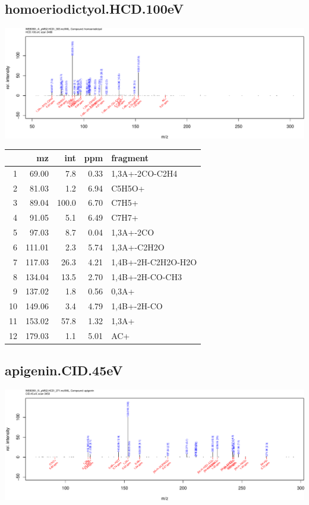 \documentclass[]{article}
\begin{document}
\clearpage\subsection{homoeriodictyol.HCD.100eV}
\includegraphics[width=\textwidth]{WEB350_files/figure-latex/unnamed-chunk-3-12}

\begin{table}[ht]
\centering
\begin{tabular}{rrrrl}
  \toprule
 & mz & int & ppm & fragment \\ 
  \midrule
1 & 69.00 & 7.8 & 0.33 & 1,3A+-2CO-C2H4 \\ 
  2 & 81.03 & 1.2 & 6.94 & C5H5O+ \\ 
  3 & 89.04 & 100.0 & 6.70 & C7H5+ \\ 
  4 & 91.05 & 5.1 & 6.49 & C7H7+ \\ 
  5 & 97.03 & 8.7 & 0.04 & 1,3A+-2CO \\ 
  6 & 111.01 & 2.3 & 5.74 & 1,3A+-C2H2O \\ 
  7 & 117.03 & 26.3 & 4.21 & 1,4B+-2H-C2H2O-H2O \\ 
  8 & 134.04 & 13.5 & 2.70 & 1,4B+-2H-CO-CH3 \\ 
  9 & 137.02 & 1.8 & 0.56 & 0,3A+ \\ 
  10 & 149.06 & 3.4 & 4.79 & 1,4B+-2H-CO \\ 
  11 & 153.02 & 57.8 & 1.32 & 1,3A+ \\ 
  12 & 179.03 & 1.1 & 5.01 & AC+ \\ 
   \bottomrule
\end{tabular}
\end{table}

\clearpage\subsection{apigenin.CID.45eV}
\includegraphics[width=\textwidth]{WEB350_files/figure-latex/unnamed-chunk-3-13}
\end{document}
